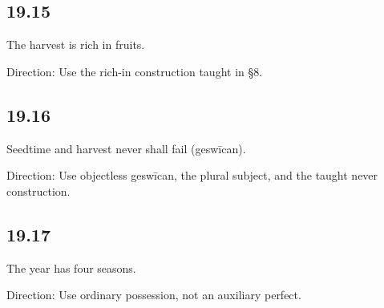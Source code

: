 \subsection*{19.15}

\par\begin{minipage}{\linewidth}\raggedright
The harvest is rich in fruits.

Direction: Use the rich-in construction taught in §8.

\end{minipage}\par\addvspace{4pt}

\subsection*{19.16}

\par\begin{minipage}{\linewidth}\raggedright
Seedtime and harvest never shall fail (geswīcan).

Direction: Use objectless geswīcan, the plural subject, and the taught never construction.

\end{minipage}\par\addvspace{4pt}

\subsection*{19.17}

\par\begin{minipage}{\linewidth}\raggedright
The year has four seasons.

Direction: Use ordinary possession, not an auxiliary perfect.

\end{minipage}\par\addvspace{4pt}

